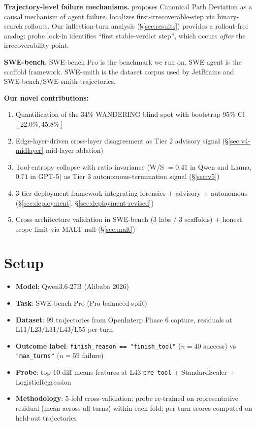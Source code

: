 \documentclass[11pt]{article}
\begin{document}
\textbf{Trajectory-level failure mechanisms.} \cite{canonical_path_2026} proposes Canonical Path Deviation as a causal mechanism of agent failure. \cite{elpo_2026} localizes first-irrecoverable-step via binary-search rollouts. Our inflection-turn analysis (\S\ref{sec:results}) provides a rollout-free analog: probe lock-in identifies ``first stable-verdict step'', which occurs \emph{after} the irrecoverability point.

\textbf{SWE-bench.} SWE-bench Pro \cite{swebench_pro_2025} is the benchmark we run on. SWE-agent \cite{swe_agent_2024} is the scaffold framework. SWE-smith \cite{swe_smith_2025} is the dataset corpus used by JetBrains and SWE-bench/SWE-smith-trajectories.

\textbf{Our novel contributions:}
\begin{enumerate}
\item Quantification of the 34\% WANDERING blind spot with bootstrap 95\% CI $[22.0\%, 45.8\%]$
\item Edge-layer-driven cross-layer disagreement as Tier 2 advisory signal (\S\ref{sec:v4-midlayer} mid-layer ablation)
\item Tool-entropy collapse with ratio invariance (W/S $= 0.41$ in Qwen and Llama, $0.71$ in GPT-5) as Tier 3 autonomous-termination signal (\S\ref{sec:v5})
\item 3-tier deployment framework integrating forensics $+$ advisory $+$ autonomous (\S\ref{sec:deployment}, \S\ref{sec:deployment-revised})
\item Cross-architecture validation in SWE-bench (3 labs / 3 scaffolds) $+$ honest scope limit via MALT null (\S\ref{sec:malt})
\end{enumerate}

\section{Setup}

\begin{itemize}
\item \textbf{Model}: Qwen3.6-27B (Alibaba 2026)
\item \textbf{Task}: SWE-bench Pro (Pro-balanced split)
\item \textbf{Dataset}: 99 trajectories from OpenInterp Phase 6 capture, residuals at L11/L23/L31/L43/L55 per turn
\item \textbf{Outcome label}: \texttt{finish\_reason == "finish\_tool"} ($n=40$ success) vs \texttt{"max\_turns"} ($n=59$ failure)
\item \textbf{Probe}: top-10 diff-means features at L43 \texttt{pre\_tool} + StandardScaler + LogisticRegression
\item \textbf{Methodology}: 5-fold cross-validation; probe re-trained on representative residual (mean across all turns) within each fold; per-turn scores computed on held-out trajectories
\end{itemize}
\end{document}
